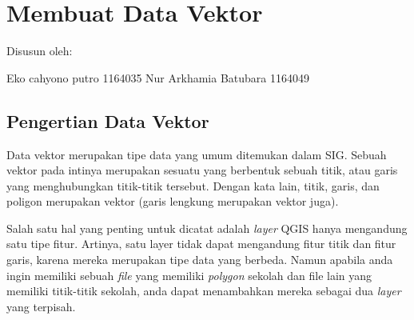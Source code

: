 

\section{Membuat Data Vektor}
Disusun oleh:

Eko cahyono putro 1164035
Nur Arkhamia Batubara 1164049

\subsection {Pengertian Data Vektor}
Data vektor merupakan tipe data yang umum ditemukan dalam SIG. Sebuah vektor pada intinya merupakan sesuatu yang berbentuk sebuah titik, atau garis yang menghubungkan titik-titik tersebut. Dengan kata lain, titik, garis, dan poligon merupakan vektor (garis lengkung merupakan vektor juga).

Salah satu hal yang penting untuk dicatat adalah \textit{layer} QGIS hanya mengandung satu tipe fitur. Artinya, satu layer tidak dapat mengandung fitur titik dan fitur garis, karena mereka merupakan tipe data yang berbeda. Namun apabila anda ingin memiliki sebuah \textit{file} yang memiliki \textit{polygon} sekolah dan file lain yang memiliki titik-titik sekolah, anda dapat menambahkan mereka sebagai dua \textit{layer} yang terpisah\cite{setiawan2018membuka}.

